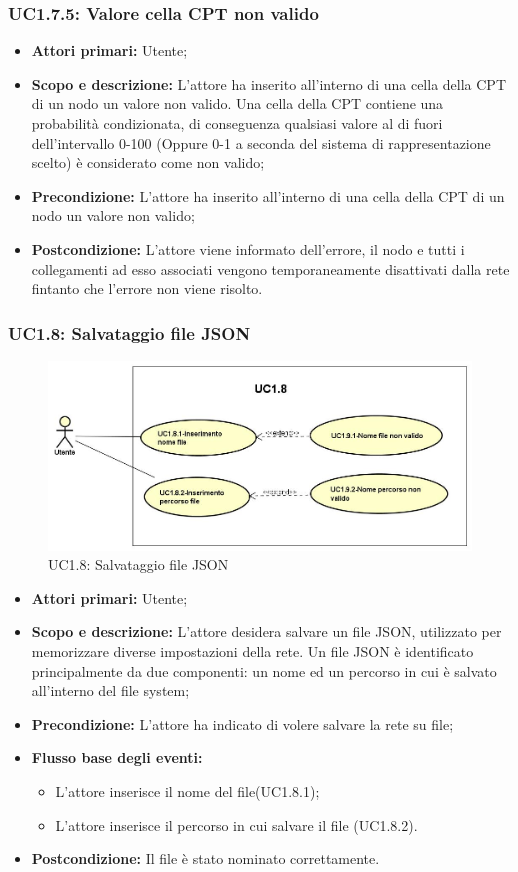 \subsubsection{UC1.7.5: Valore cella CPT non valido} 
\begin{itemize} 
	\item{\textbf{Attori primari:} Utente;} 
	\item{\textbf{Scopo e descrizione:} L'attore ha inserito all'interno di una cella della CPT di un nodo un valore non valido. Una cella della CPT contiene una probabilità condizionata, di conseguenza qualsiasi valore al di fuori dell'intervallo 0-100 (Oppure 0-1 a seconda del sistema di rappresentazione scelto) è considerato come non valido;} 
	\item{\textbf{Precondizione:} L'attore ha inserito all'interno di una cella della CPT di un nodo un valore non valido;} 
	\item{\textbf{Postcondizione:} L'attore viene informato dell'errore, il nodo e tutti i collegamenti ad esso associati vengono temporaneamente disattivati dalla rete fintanto che l'errore non viene risolto.} 
\end{itemize} 
\subsubsection{UC1.8: Salvataggio file JSON} 
\begin{figure} [H]
	\centering
	\includegraphics[scale=0.45]{Img/UC1-8} 
	\caption{UC1.8: Salvataggio file JSON} \label{} 
\end{figure} 
\begin{itemize} 
	\item{\textbf{Attori primari:} Utente;} 
	\item{\textbf{Scopo e descrizione:} L'attore desidera salvare un file JSON, utilizzato per memorizzare diverse impostazioni della rete. Un file JSON è identificato principalmente da due componenti: un nome ed un percorso in cui è salvato all'interno del file system;} 
	\item{\textbf{Precondizione:} L'attore ha indicato di volere salvare la rete su file;} 
	\item{\textbf{Flusso base degli eventi:} } 
	\begin{itemize} 
		\item{L'attore inserisce il nome del file(UC1.8.1);} 
		\item{L'attore inserisce il percorso in cui salvare il file (UC1.8.2).} 
	\end{itemize} 
	\item{\textbf{Postcondizione:} Il file è stato nominato correttamente.} 
\end{itemize} 
